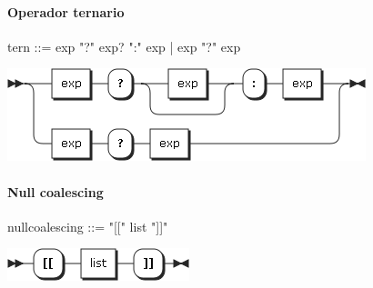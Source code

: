 \paragraph{Operador ternario}
\begin{multicols}{2}
\begin{myverbatim}      
tern ::= exp "?" exp? ":" exp
   |  exp "?" exp
\end{myverbatim}  
\columnbreak	
\begin{center}
\includegraphics[scale=0.5]{diagram/tern.png} \\
\end{center}
\end{multicols}
\paragraph{Null coalescing}
\begin{multicols}{2}
\begin{myverbatim}      
nullcoalescing ::= "[[" list "]]"
\end{myverbatim}  
\columnbreak	
\begin{center}
\includegraphics[scale=0.5]{diagram/nullcoalescing.png} \\
\end{center}
\end{multicols}

\pagebreak
